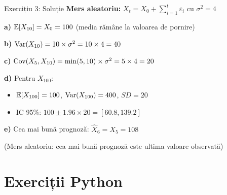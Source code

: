 \documentclass[9pt, aspectratio=169, t]{beamer}
\begin{document}
\begin{frame}{Exercițiu 3: Soluție}
    \textbf{Mers aleatoriu:} $X_t = X_0 + \sum_{i=1}^{t} \varepsilon_i$ cu $\sigma^2 = 4$

    \vspace{0.3cm}

    \textbf{a)} $\mathbb{E}[X_{10}] = X_0 = 100$ \quad (media rămâne la valoarea de pornire)

    \vspace{0.2cm}

    \textbf{b)} $\text{Var}(X_{10}) = 10 \times \sigma^2 = 10 \times 4 = 40$

    \vspace{0.2cm}

    \textbf{c)} $\text{Cov}(X_5, X_{10}) = \min(5, 10) \times \sigma^2 = 5 \times 4 = 20$

    \vspace{0.2cm}

    \textbf{d)} Pentru $X_{100}$:
    \begin{itemize}
        \item $\mathbb{E}[X_{100}] = 100$, $\text{Var}(X_{100}) = 400$, $SD = 20$
        \item IC 95\%: $100 \pm 1.96 \times 20 = [60.8, 139.2]$
    \end{itemize}

    \vspace{0.2cm}

    \textbf{e)} Cea mai bună prognoză: $\hat{X}_6 = X_5 = 108$

    {\small (Mers aleatoriu: cea mai bună prognoză este ultima valoare observată)}
\end{frame}

\section{Exerciții Python}
\end{document}
